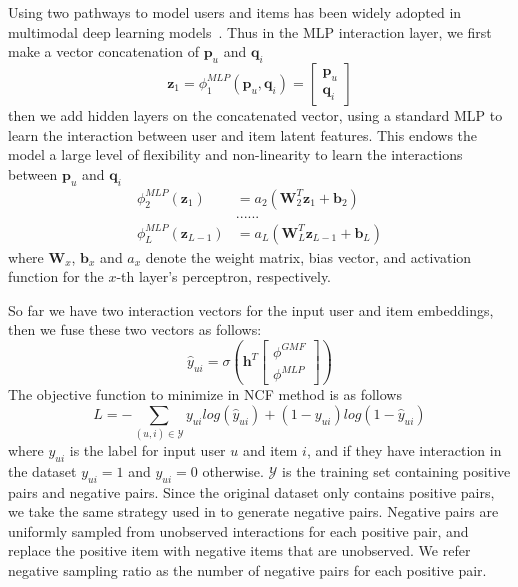 Using two pathways to model users and items has been widely adopted in multimodal deep learning models~\cite{RS1,RS2}. Thus in the MLP interaction layer, we first make a vector concatenation of $\mathbf{p}_u$ and $\mathbf{q}_i$
\begin{equation}
    \mathbf{z}_1 = \phi_1^{MLP}(\mathbf{p}_u, \mathbf{q}_i) = {
\left[ \begin{array}{ccc}
\mathbf{p}_u \\
\mathbf{q}_i
\end{array} 
\right ]}
\end{equation}
then we add hidden layers on the concatenated vector, using a standard MLP to learn the interaction between user and item latent features. This endows the model a large level of flexibility and non-linearity to learn the interactions between $\mathbf{p}_u$ and $\mathbf{q}_i$
\begin{align}
    \phi_2^{MLP}(\mathbf{z}_1) & = a_2 (\mathbf{W}_2 ^T \mathbf{z}_1 + \mathbf{b}_2) \\
    & ...... \\
    \phi_L^{MLP}(\mathbf{z}_{L-1}) & = a_{L} (\mathbf{W}_L ^T \mathbf{z}_{L-1} + \mathbf{b}_L) 
\end{align}
where $\mathbf{W}_x$, $\mathbf{b}_x$ and $a_x$ denote the weight matrix, bias vector, and activation function for the $x$-th layer's perceptron, respectively.



So far we have two interaction vectors for the input user and item embeddings, then we fuse these two vectors as follows:
\begin{equation}
\hat{y}_{ui} = \sigma(\mathbf{h}^T {
\left[ \begin{array}{ccc}
\phi^{GMF} \\
\phi^{MLP} 
\end{array} 
\right ]})
\end{equation}
The objective function to minimize in NCF method is as follows
\begin{equation}\label{equation-19}
    L = - \sum_{(u,i) \in \mathcal{Y}} y_{ui} log(\hat{y}_{ui}) + (1-y_{ui})log(1-\hat{y}_{ui})
\end{equation}
where $y_{ui}$ is the label for input user $u$ and item $i$, and if they have interaction in the dataset $y_{ui}=1$ and $y_{ui}=0$ otherwise. $\mathcal{Y}$ is the training set containing positive pairs and negative pairs. Since the original dataset only contains positive pairs, we take the same strategy used in \cite{DBLP:conf/www/HeLZNHC17} to generate negative pairs. Negative pairs are uniformly sampled from unobserved interactions for each positive pair, and replace the positive item with negative items that are unobserved. We refer negative sampling ratio as the number of negative pairs for each positive pair.

